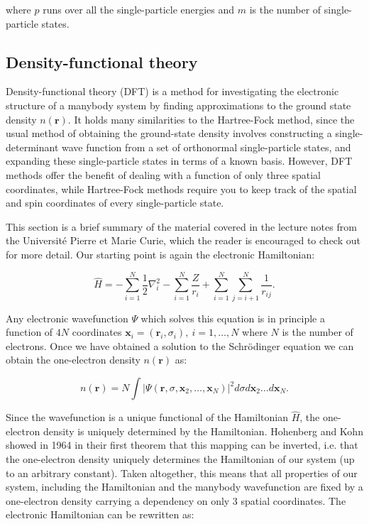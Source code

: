 where $p$ runs over all the single-particle energies and
$m$ is the number of single-particle states.

\subsection{Density-functional theory}
Density-functional theory (DFT) is a method for
investigating the electronic structure of a manybody system
by finding approximations to the ground state
density $n(\bm{r})$.
It holds many similarities to the Hartree-Fock method,
since the usual method of obtaining the ground-state density
involves constructing a single-determinant wave function
from a set of orthonormal single-particle states,
and expanding these single-particle states in terms
of a known basis. However, DFT methods
offer the benefit of dealing with a function of only
three spatial coordinates, while Hartree-Fock methods
require you to keep track of the spatial and spin coordinates
of every single-particle state.
\par
This section is a brief summary of the material covered
in the \parencite[Toulouse][pages 1-12]{toulouse2017}
lecture notes from the Université Pierre et Marie Curie,
which the reader is encouraged to check out for more detail.
Our starting point is again the electronic Hamiltonian:

\begin{equation}
    \hat{H} = -\sum_{i=1}^N \frac{1}{2} \nabla_i^2
    - \sum_{i=1}^N \frac{Z}{r_{i}} + \sum_{i=1}^N \sum_{j=i+1}^N
    \frac{1}{r_{ij}} .
\end{equation}

Any electronic wavefunction $\Psi$ which solves this equation
is in principle a function of $4N$ coordinates $\bm{x}_i = (\bm{r}_i, \sigma_i)
, \ i=1,\dots,N$
where $N$ is the number of electrons.
Once we have obtained a solution to the Schr\"{o}dinger equation
we can obtain the one-electron density $n(\bm{r})$ as:

\begin{equation}
    n(\bm{r}) = N \int \left| \Psi(\bm{r}, \sigma, \bm{x}_2,\dots,\bm{x}_N)
    \right|^2 d\sigma d\bm{x}_2 \dots d\bm{x}_N .
\end{equation}

Since the wavefunction is a unique functional of the Hamiltonian
$\hat{H}$, the one-electron density is uniquely determined
by the Hamiltonian. Hohenberg and Kohn showed in 1964
\cite{hohenberg1964inhomogeneous} in their first theorem that this mapping
can be inverted, i.e. that the one-electron density uniquely
determines the Hamiltonian of our system (up to an arbitrary constant).
Taken altogether, this means that all properties of our system, including
the Hamiltonian and the manybody wavefunction are fixed
by a one-electron density carrying a dependency on only 3 spatial coordinates.
The electronic Hamiltonian can be rewritten as:

